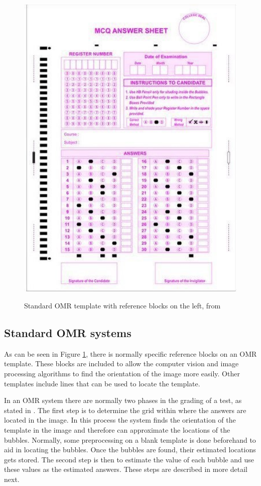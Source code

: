 \begin{figure}
  \centering
  \includegraphics[width=14cm]{omrTemplate}\\
  \caption{Standard OMR template with reference blocks on the left, from \citet{stdTemplate}}
  \label{fig:omrTemplate}
\end{figure}

\subsection{Standard OMR systems}
\label{sec:StandardTech}

As can be seen in Figure \ref{fig:omrTemplate}, there is normally specific reference blocks on an OMR template. These blocks are included to allow the computer vision and image processing algorithms to find the orientation of the image more easily. Other templates include lines that can be used to locate the template.

In an OMR system there are normally two phases in the grading of a test, as stated in \citet{DraganI2003}. The first step is to determine the grid within where the answers are located in the image. In this process the system finds the orientation of the template in the image and therefore can approximate the locations of the bubbles. Normally, some preprocessing on a blank template is done beforehand to aid in locating the bubbles. Once the bubbles are found, their estimated locations gets stored. The second step is then to estimate the value of each bubble and use these values as the estimated answers. These steps are described in more detail next.

